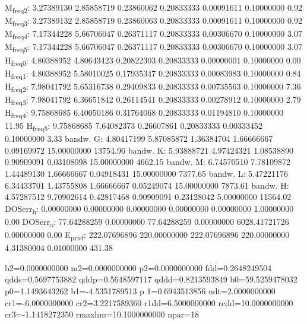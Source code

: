\documentclass[11pt]{article}
\begin{document}
M\textsubscript{freq}\textsubscript{2}:   3.27389130   2.85858719   0.23860062   0.20833333   0.00091611   0.10000000         0.92
M\textsubscript{freq}\textsubscript{3}:   3.27389132   2.85858719   0.23860063   0.20833333   0.00091611   0.10000000         0.92
M\textsubscript{freq}\textsubscript{4}:   7.17344228   5.66706047   0.26371117   0.20833333   0.00306670   0.10000000         3.07
M\textsubscript{freq}\textsubscript{5}:   7.17344228   5.66706047   0.26371117   0.20833333   0.00306670   0.10000000         3.07
H\textsubscript{freq}\textsubscript{0}:   4.80388952   4.80643423   0.20822303   0.20833333   0.00000001   0.10000000         0.00
H\textsubscript{freq}\textsubscript{1}:   4.80388952   5.58010025   0.17935347   0.20833333   0.00083983   0.10000000         0.84
H\textsubscript{freq}\textsubscript{2}:   7.98041792   5.65316738   0.29409833   0.20833333   0.00735563   0.10000000         7.36
H\textsubscript{freq}\textsubscript{3}:   7.98041792   6.36651842   0.26114541   0.20833333   0.00278912   0.10000000         2.79
H\textsubscript{freq}\textsubscript{4}:   9.75868685   6.40050186   0.31764068   0.20833333   0.01194810   0.10000000        11.95
H\textsubscript{freq}\textsubscript{5}:   9.75868685   7.64082373   0.26607861   0.20833333   0.00333452   0.10000000         3.33
bandw. G:   4.80417199   5.87085872   1.36384704   1.66666667   0.09169972  15.00000000     13754.96
bandw. K:   5.93888721   4.97424321   1.08538890   0.90909091   0.03108098  15.00000000      4662.15
bandw. M:   6.74570510   7.78109872   1.44489130   1.66666667   0.04918431  15.00000000      7377.65
bandw. L:   5.47221176   6.34433701   1.43755808   1.66666667   0.05249074  15.00000000      7873.61
bandw. H:   4.57287512   9.70902614   0.42817468   0.90909091   0.23128042   5.00000000     11564.02
DOSerr\textsubscript{h}:   0.00000000   0.00000000   0.00000000   0.00000000   0.00000000   1.00000000         0.00
DOSerr\textsubscript{o}:  77.64288259   0.00000000  77.64288259   0.00000000 6028.41721726   0.00000000         0.00
E\textsubscript{pris}\textsubscript{f}: 222.07696896 220.00000000 222.07696896 220.00000000   4.31380004   0.01000000       431.38

  b2=0.0000000000 m2=0.0000000000 p2=0.0000000000 fdd=0.2648249504 qdds=0.5697753882 qddp=0.5648597117 qddd=0.8213593849 b0=59.5259478032 p0=1.1493643262 b1=-4.5351789513 p
1=0.6943513856 ndt=2.0000000000 cr1=-6.0000000000 cr2=3.2217589360 r1dd=6.5000000000 rcdd=10.0000000000 cr3=-1.1418272350 rmaxhm=10.1000000000 npar=18 
\end{document}
